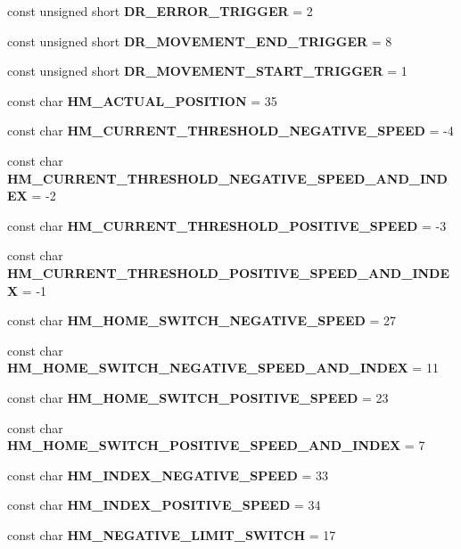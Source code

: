 \begin{DoxyCompactItemize}
const unsigned short {\bf \-D\-R\-\_\-\-E\-R\-R\-O\-R\-\_\-\-T\-R\-I\-G\-G\-E\-R} = 2
\item 
const unsigned short {\bf \-D\-R\-\_\-\-M\-O\-V\-E\-M\-E\-N\-T\-\_\-\-E\-N\-D\-\_\-\-T\-R\-I\-G\-G\-E\-R} = 8
\item 
const unsigned short {\bf \-D\-R\-\_\-\-M\-O\-V\-E\-M\-E\-N\-T\-\_\-\-S\-T\-A\-R\-T\-\_\-\-T\-R\-I\-G\-G\-E\-R} = 1
\item 
const char {\bf \-H\-M\-\_\-\-A\-C\-T\-U\-A\-L\-\_\-\-P\-O\-S\-I\-T\-I\-O\-N} = 35
\item 
const char {\bf \-H\-M\-\_\-\-C\-U\-R\-R\-E\-N\-T\-\_\-\-T\-H\-R\-E\-S\-H\-O\-L\-D\-\_\-\-N\-E\-G\-A\-T\-I\-V\-E\-\_\-\-S\-P\-E\-E\-D} = -\/4
\item 
const char {\bf \-H\-M\-\_\-\-C\-U\-R\-R\-E\-N\-T\-\_\-\-T\-H\-R\-E\-S\-H\-O\-L\-D\-\_\-\-N\-E\-G\-A\-T\-I\-V\-E\-\_\-\-S\-P\-E\-E\-D\-\_\-\-A\-N\-D\-\_\-\-I\-N\-D\-E\-X} = -\/2
\item 
const char {\bf \-H\-M\-\_\-\-C\-U\-R\-R\-E\-N\-T\-\_\-\-T\-H\-R\-E\-S\-H\-O\-L\-D\-\_\-\-P\-O\-S\-I\-T\-I\-V\-E\-\_\-\-S\-P\-E\-E\-D} = -\/3
\item 
const char {\bf \-H\-M\-\_\-\-C\-U\-R\-R\-E\-N\-T\-\_\-\-T\-H\-R\-E\-S\-H\-O\-L\-D\-\_\-\-P\-O\-S\-I\-T\-I\-V\-E\-\_\-\-S\-P\-E\-E\-D\-\_\-\-A\-N\-D\-\_\-\-I\-N\-D\-E\-X} = -\/1
\item 
const char {\bf \-H\-M\-\_\-\-H\-O\-M\-E\-\_\-\-S\-W\-I\-T\-C\-H\-\_\-\-N\-E\-G\-A\-T\-I\-V\-E\-\_\-\-S\-P\-E\-E\-D} = 27
\item 
const char {\bf \-H\-M\-\_\-\-H\-O\-M\-E\-\_\-\-S\-W\-I\-T\-C\-H\-\_\-\-N\-E\-G\-A\-T\-I\-V\-E\-\_\-\-S\-P\-E\-E\-D\-\_\-\-A\-N\-D\-\_\-\-I\-N\-D\-E\-X} = 11
\item 
const char {\bf \-H\-M\-\_\-\-H\-O\-M\-E\-\_\-\-S\-W\-I\-T\-C\-H\-\_\-\-P\-O\-S\-I\-T\-I\-V\-E\-\_\-\-S\-P\-E\-E\-D} = 23
\item 
const char {\bf \-H\-M\-\_\-\-H\-O\-M\-E\-\_\-\-S\-W\-I\-T\-C\-H\-\_\-\-P\-O\-S\-I\-T\-I\-V\-E\-\_\-\-S\-P\-E\-E\-D\-\_\-\-A\-N\-D\-\_\-\-I\-N\-D\-E\-X} = 7
\item 
const char {\bf \-H\-M\-\_\-\-I\-N\-D\-E\-X\-\_\-\-N\-E\-G\-A\-T\-I\-V\-E\-\_\-\-S\-P\-E\-E\-D} = 33
\item 
const char {\bf \-H\-M\-\_\-\-I\-N\-D\-E\-X\-\_\-\-P\-O\-S\-I\-T\-I\-V\-E\-\_\-\-S\-P\-E\-E\-D} = 34
\item 
const char {\bf \-H\-M\-\_\-\-N\-E\-G\-A\-T\-I\-V\-E\-\_\-\-L\-I\-M\-I\-T\-\_\-\-S\-W\-I\-T\-C\-H} = 17
\item 

\end{DoxyCompactItemize}
